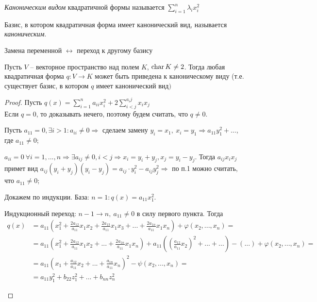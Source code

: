 \begin{Def}
	\textit{Каноническим видом}  квадратичной формы называется $\displaystyle \sum_{i=1}^{n} \lambda_i x^2_i $
\end{Def} 

\begin{Def}
	Базис, в котором квадратичная форма имеет канонический вид, называется \textit{каноническим}.
\end{Def} 

\begin{Rem}
	Замена переменной $\leftrightarrow$ переход к другому базису
\end{Rem}

\begin{Thm} 
	Пусть $V$ -- векторное пространство над полем $K$, $\operatorname{char} K \neq 2$. 
	Тогда любая квадратичная форма $q : V \to K$ может быть приведена к каноническому виду (т.е. существует базис, в котором $q$ имеет канонический вид$)$
\end{Thm} 

\begin{proof}
	Пусть $q(x) = \sum_{i=1}^{n} a_{ii}x^2_i + 2 \sum_{i<j}^{a_ij} x_i x_j$\\
	Если $q = 0$, то доказывать нечего, поэтому будем считать, что $q \neq 0$. 
	\begin{MyList}
		\item Пусть $a_{11} = 0, \exists i > 1: a_{ii} \neq 0 \Rightarrow$ сделаем замену $y_i = x_1, \ x_i = y_1 \Rightarrow a_{11} y_1^2 + ... $, где $a_{11} \neq 0$;
		\item $a_{ii} = 0 \ \forall i = 1, ..., n \Rightarrow \exists a_{ij} \neq 0, i < j \Rightarrow x_i = y_i+y_j, x_j = y_i - y_j$. 
		Тогда $a_{ij} x_i x_j$ примет вид $a_{ij}(y_i+y_j)(y_i-y_j) = a_{ij} \cdot y_i^2 - a_{ij} y^2_j \Rightarrow$ по п.1 можно считать, что $a_{11} \neq 0$;
		\item Докажем по индукции.
		База: $n=1 : q(x) = a_{11} x_1^2$.

		Индукционный переход: $n-1 \to n, \ a_{11} \neq 0$ в силу первого пункта. Тогда
		\begin{align*}
			q(x) &= a_{11}\left(x_1^2 + \frac{2a_{12}}{a_{11}} x_1x_2 + \frac{2a_{13}}{a_{11}} x_1x_3 +... + \frac{2a_{1n}}{a_{11}} x_1x_n\right) + \varphi(x_2, ..., x_n) = \\
			&= a_{11}\left(x_1^2 + \frac{2a_{12}}{a_{11}} x_1x_2 + ... + \frac{2a_{1n}}{a_{11}} x_1x_n\right) + a_{11}\left(\left( \frac{a_{12}}{a_{11}} x_2\right)^2  + ... + ...\right) - (...) + \varphi (x_2, ..., x_n) = \\
			&= a_{11}\left(x_1 + \frac{a_{12}}{a_{11}} x_2 + ... + \frac{a_{1n}}{a_{11}} x_n\right)^2 - \psi (x_2, ..., x_n) = \\
			&= a_{11} y^2_1 + b_{22}z_1^2 + ... + b_{nn}z_n^2
		\end{align*}
	\end{MyList}
\end{proof}

